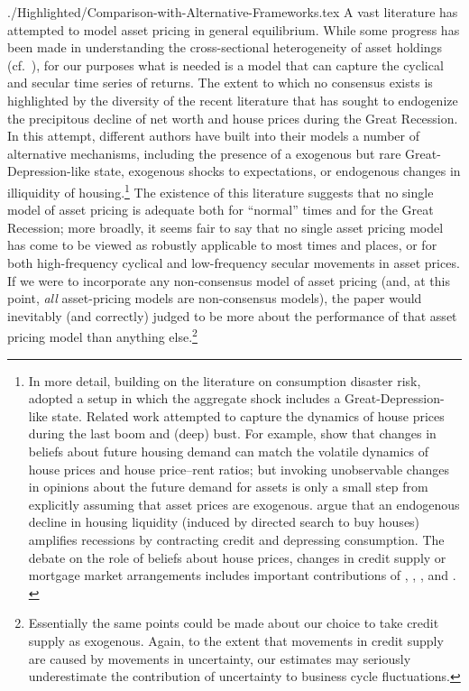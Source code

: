 \documentclass[titlepage]{\econtex}
\begin{document}
\begin{verbatimwrite}{./Highlighted/Comparison-with-Alternative-Frameworks.tex}
A vast literature has attempted to model asset pricing in general equilibrium.  While some progress has been made in understanding the cross-sectional heterogeneity of asset holdings (cf.\ \cite{gmAssetPricing}), for our purposes what is needed is a model that can capture the cyclical and secular time series of returns.  %
The extent to which no consensus exists is highlighted by the diversity of the recent literature that has sought to endogenize the precipitous decline of net worth and house prices during the Great Recession.  In this attempt, different authors have built into their models a number of alternative mechanisms, including the presence of a exogenous but rare Great-Depression-like state, exogenous shocks to expectations, or endogenous changes in illiquidity of housing.\footnote{In more detail, building on the literature on consumption disaster risk, \cite{glover:intergenRedistr} adopted a setup in which the aggregate shock includes a Great-Depression-like state. Related work attempted to capture the dynamics of house prices during the last boom and (deep) bust. For example, \cite{kmv:houseBoomBust} show that changes in beliefs about future housing demand can match the volatile dynamics of house prices and house price--rent ratios; but invoking unobservable changes in opinions about the future demand for assets is only a small step from explicitly assuming that asset prices are exogenous. \cite{garrigaHedlund} argue that an endogenous decline in housing liquidity (induced by directed search to buy houses) amplifies recessions by contracting credit and depressing consumption.  The debate on the role of beliefs about house prices, changes in credit supply or mortgage market arrangements includes important contributions of \cite{favilukis:housing}, \cite{kmv:houseBoomBust}, \cite{justPrimTamb:CredSupplyAndHouseBoom}, and \cite{garrigaHedlund}. \label{foot_housingLit}}  The existence of this literature suggests that no single model of asset pricing is adequate both for ``normal'' times and for the Great Recession; more broadly, it seems fair to say that no single asset pricing model has come to be viewed as robustly applicable to most times and places, or for both high-frequency cyclical and low-frequency secular movements in asset prices.  If we were to incorporate any non-consensus model of asset pricing (and, at this point, \textit{all} asset-pricing models are non-consensus models), the paper would inevitably (and correctly) judged to be more about the performance of that asset pricing model than anything else.\footnote{Essentially the same points could be made about our choice to take credit supply as exogenous.  Again, to the extent that movements in credit supply are caused by movements in uncertainty, our estimates may seriously underestimate the contribution of uncertainty to business cycle fluctuations.}



\end{verbatimwrite}
\end{document}
